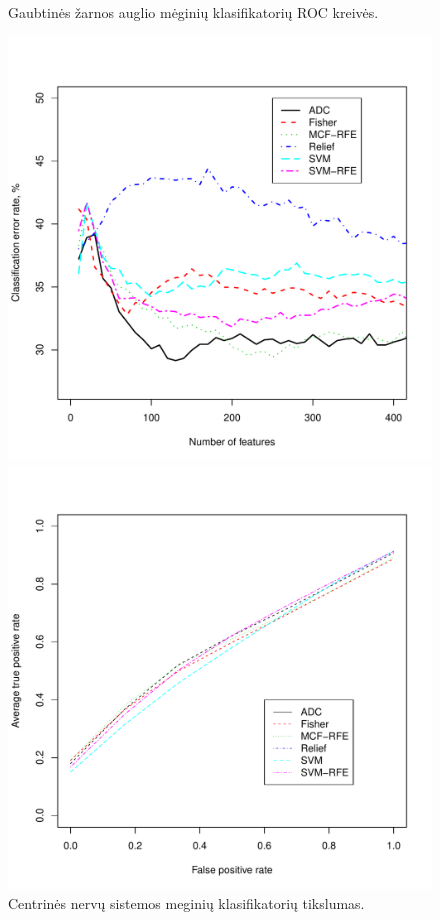 \begin{figure}[H]
\begin{minipage}[b]{0.5\linewidth}
\caption{Gaubtinės žarnos auglio mėginių klasifikatorių ROC kreivės.}
\label{fig:roc_colon}
\end{minipage}
\hspace{0.2cm}
\begin{minipage}[b]{0.5\linewidth}
\centering
\includegraphics[width=.9\textwidth]{../bachelor/images/nncns_classification.pdf}
\caption{Centrinės nervų sistemos meginių klasifikatorių tikslumas.}
\label{fig:class_cns}
\end{minipage}
\hspace{0.2cm}
\begin{minipage}[b]{0.5\linewidth}
\centering
\includegraphics[width=.9\textwidth]{../bachelor/images/nncns_roc.pdf}

\end{minipage}
\end{figure}
